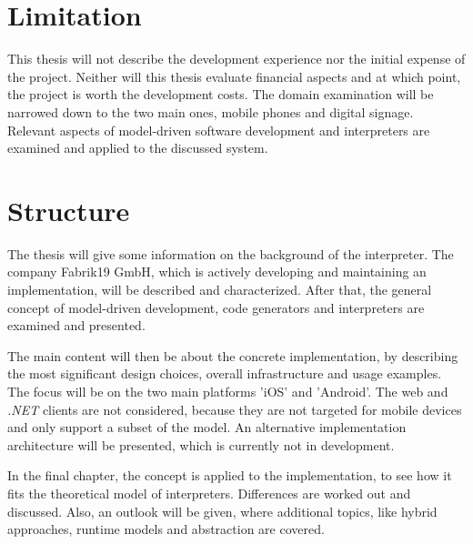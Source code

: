 \section{Limitation}

This thesis will not describe the development experience nor the initial expense of the project.
Neither will this thesis evaluate financial aspects and at which point, the project is worth the development costs.
The domain examination will be narrowed down to the two main ones, mobile phones and digital signage.
Relevant aspects of model-driven software development and interpreters are examined and applied to the discussed system.


\section{Structure}

The thesis will give some information on the background of the interpreter.
The company Fabrik19 GmbH, which is actively developing and maintaining an implementation, will be described and characterized.
After that, the general concept of model-driven development, code generators and interpreters are examined and presented.

The main content will then be about the concrete implementation, by describing the most significant design choices, overall infrastructure and usage examples.
The focus will be on the two main platforms 'iOS' and 'Android'.
The web and \textit{.NET} clients are not considered, because they are not targeted for mobile devices and only support a subset of the model.
An alternative implementation architecture will be presented, which is currently not in development.

In the final chapter, the concept is applied to the implementation, to see how it fits the theoretical model of interpreters.
Differences are worked out and discussed.
Also, an outlook will be given, where additional topics, like hybrid approaches, runtime models and abstraction are covered.



